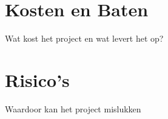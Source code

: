 \section{Kosten en Baten}
Wat kost het project en wat levert het op?


\section{Risico's}
Waardoor kan het project mislukken